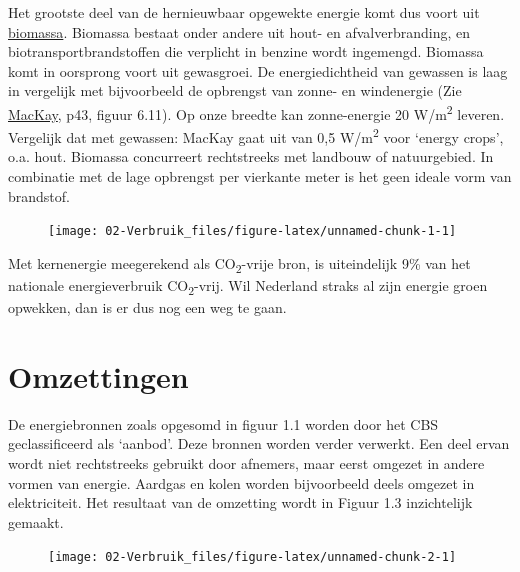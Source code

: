 \documentclass[
  11pt,
  a4paper,
]{book}
\begin{document}
Het grootste deel van de hernieuwbaar opgewekte energie komt dus voort uit \href{https://longreads.cbs.nl/hernieuwbare-energie-in-nederland-2019/biomassa/}{biomassa}. Biomassa bestaat onder andere uit hout- en afvalverbranding, en biotransportbrandstoffen die verplicht in benzine wordt ingemengd. Biomassa komt in oorsprong voort uit gewasgroei. De energiedichtheid van gewassen is laag in vergelijk met bijvoorbeeld de opbrengst van zonne- en windenergie (Zie \href{https://www.withouthotair.com/download.html}{MacKay}, p43, figuur 6.11). Op onze breedte kan zonne-energie 20 W/m\textsuperscript{2} leveren. Vergelijk dat met gewassen: MacKay gaat uit van 0,5 W/m\textsuperscript{2} voor `energy crops', o.a. hout. Biomassa concurreert rechtstreeks met landbouw of natuurgebied. In combinatie met de lage opbrengst per vierkante meter is het geen ideale vorm van brandstof.

\begin{figure}[!t]

{\centering \texttt{[image: 02-Verbruik\_files/figure-latex/unnamed-chunk-1-1]} 

}

\end{figure}

Met kernenergie meegerekend als CO\textsubscript{2}-vrije bron, is uiteindelijk 9\% van het nationale energieverbruik CO\textsubscript{2}-vrij. Wil Nederland straks al zijn energie groen opwekken, dan is er dus nog een weg te gaan.

\hypertarget{omzettingen}{%
\section{Omzettingen}\label{omzettingen}}

De energiebronnen zoals opgesomd in figuur 1.1 worden door het CBS geclassificeerd als `aanbod'. Deze bronnen worden verder verwerkt. Een deel ervan wordt niet rechtstreeks gebruikt door afnemers, maar eerst omgezet in andere vormen van energie. Aardgas en kolen worden bijvoorbeeld deels omgezet in elektriciteit. Het resultaat van de omzetting wordt in Figuur 1.3 inzichtelijk gemaakt.

\begin{figure}[b]

{\centering \texttt{[image: 02-Verbruik\_files/figure-latex/unnamed-chunk-2-1]} 

}

\end{figure}
\end{document}
